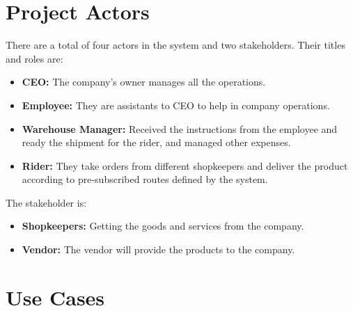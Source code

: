 \documentclass[12pt,a4paper]{report}
\begin{document}
\chapter {Project Actors}
There are a total of four actors in the system and two stakeholders. Their titles and roles are:
\begin{itemize}
\item \textbf{ CEO:} The company's owner manages all the operations.
\item \textbf{Employee:} They are assistants to CEO to help in company operations. 
\item \textbf{Warehouse Manager:} Received the instructions from the employee and ready the shipment for the rider, and managed other expenses.
\item \textbf{Rider:} They take orders from different shopkeepers and deliver the product according to pre-subscribed routes defined by the system.
\end{itemize}
The stakeholder is:
\begin{itemize}
\item \textbf{Shopkeepers:} Getting the goods and services from the company.
\item \textbf{Vendor:} The vendor will provide the products to the company. 
\end{itemize}
\newpage
\chapter {Use Cases}
\end{document}
